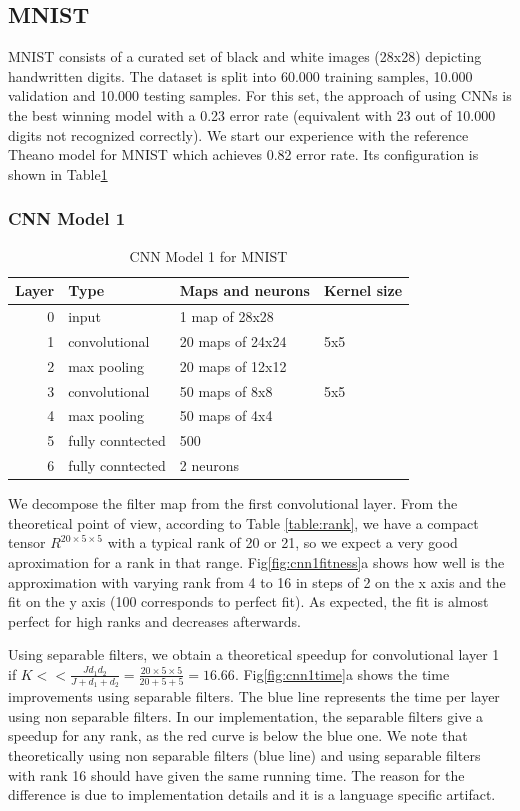 
\subsection{MNIST}
MNIST consists of a curated set of black and white images (28x28) depicting handwritten digits.
The dataset is split into 60.000 training samples, 10.000 validation and 
10.000 testing samples. For this set, the approach of \cite{DBLP:journals/corr/abs-1202-2745} using CNNs is the best winning model with a 0.23 error rate (equivalent with 23 out of 10.000 digits not recognized correctly).
We start our experience with the reference Theano model for MNIST which achieves 0.82 error rate. Its configuration is shown in Table\ref{fig:cnn1}
\subsubsection{CNN Model 1}
\begin{table}
\centering
\begin{tabular}{@{}rlll@{}}\toprule
Layer & Type & Maps and neurons& Kernel size \\ \midrule
0 & input & 1 map of 28x28 &\\
1& convolutional & 20 maps of 24x24 & 5x5\\
2 & max pooling & 20 maps of 12x12 &  \\
3 & convolutional & 50 maps of 8x8& 5x5 \\
4 & max pooling & 50 maps of 4x4&  \\ 
5 & fully conntected& 500 & \\
6 & fully conntected & 2 neurons & \\ \bottomrule
\end{tabular}
\caption{CNN Model 1 for MNIST}
\label{fig:cnn1}
\end{table}

We decompose the filter map from the first convolutional layer. From the theoretical point of view, according to Table \ref{table:rank}, we have a compact tensor $R^{20\times 5 \times 5}$ with a typical rank of 20 or 21, so we expect a very good aproximation for a rank in that range. 
Fig\ref{fig:cnn1fitness}a shows how well is the approximation with varying rank from 4 to 16 in steps of 2 on the x axis and the fit on the y axis (100 corresponds to perfect fit). As expected, the fit is almost perfect for high ranks and decreases afterwards.

Using separable filters, we obtain a theoretical speedup for convolutional layer 1 if $K<< \frac{Jd_{1}d_{2}}{J +d_{1}+d_{2}} = \frac{20\times 5\times 5}{20 + 5 + 5} = 16.66$. Fig\ref{fig:cnn1time}a shows the time improvements using separable filters. The blue line represents the time per layer using non separable filters. In our implementation, the separable filters give a speedup for any rank, as the red curve is below the blue one. 
We note that theoretically using non separable filters (blue line) and using separable filters with rank 16 should have given the same running time. The reason for the difference is due to implementation details and it is a language specific artifact.

